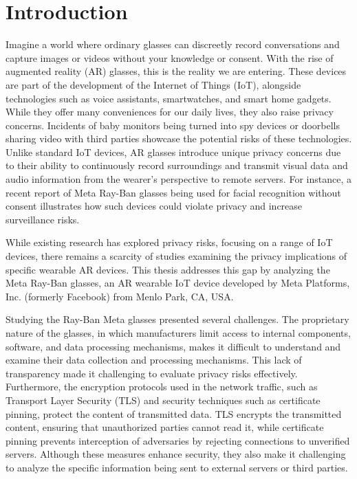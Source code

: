 \chapter{Introduction}
\label{chap:introduction}

Imagine a world where ordinary glasses can discreetly record conversations and capture images or videos without your knowledge or consent. With the rise of augmented reality (AR) glasses, this is the reality we are entering. These devices are part of the development of the Internet of Things (IoT), alongside technologies such as voice assistants, smartwatches, and smart home gadgets. While they offer many conveniences for our daily lives, they also raise privacy concerns. Incidents of baby monitors being turned into spy devices or doorbells sharing video with third parties showcase the potential risks of these technologies. Unlike standard IoT devices, AR glasses introduce unique privacy concerns due to their ability to continuously record surroundings and transmit visual data and audio information from the wearer's perspective to remote servers. For instance, a recent report of Meta Ray-Ban glasses being used for facial recognition without consent \citet{IXRAY2025} illustrates how such devices could violate privacy and increase surveillance risks.

While existing research has explored privacy risks, focusing on a range of IoT devices, there remains a scarcity of studies examining the privacy implications of specific wearable AR devices. This thesis addresses this gap by analyzing the Meta Ray-Ban glasses, an AR wearable IoT device developed by Meta Platforms, Inc. (formerly Facebook) from Menlo Park, CA, USA. 

Studying the Ray-Ban Meta glasses presented several challenges. The proprietary nature of the glasses, in which manufacturers limit access to internal components, software, and data processing mechanisms, makes it difficult to understand and examine their data collection and processing mechanisms. This lack of transparency made it challenging to evaluate privacy risks effectively. Furthermore, the encryption protocols used in the network traffic, such as Transport Layer Security (TLS) and security techniques such as certificate pinning, protect the content of transmitted data. TLS encrypts the transmitted content, ensuring that unauthorized parties cannot read it, while certificate pinning prevents interception of adversaries by rejecting connections to unverified servers. Although these measures enhance security, they also make it challenging to analyze the specific information being sent to external servers or third parties. 

